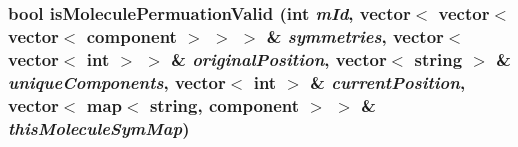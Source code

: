 \subsubsection{\setlength{\rightskip}{0pt plus 5cm}bool isMoleculePermuationValid (int {\em mId}, vector$<$ vector$<$ vector$<$ {\bf component} $>$ $>$ $>$ \& {\em symmetries}, vector$<$ vector$<$ int $>$ $>$ \& {\em originalPosition}, vector$<$ string $>$ \& {\em uniqueComponents}, vector$<$ int $>$ \& {\em currentPosition}, vector$<$ map$<$ string, {\bf component} $>$ $>$ \& {\em thisMoleculeSymMap})}\label{parseSymRxns_8cpp_c7630a3fe7a3caeb20a5db863f6a8385}


